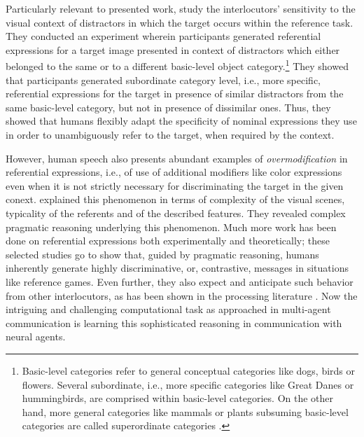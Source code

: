 Particularly relevant to presented work, \cite{graf2016animal} study the interlocutors' sensitivity to the visual context of distractors in which the target occurs within the reference task. They conducted an experiment wherein participants generated referential expressions for a target image presented in context of distractors which either belonged to the same or to a different basic-level object category.\footnote{Basic-level categories refer to general conceptual categories like dogs, birds or flowers. Several subordinate, i.e., more specific categories like Great Danes or hummingbirds, are comprised within basic-level categories. On the other hand, more general categories like mammals or plants subsuming basic-level categories are called superordinate categories \parencite{rosch1976basic}.} They showed that participants generated subordinate category level, i.e., more specific, referential expressions for the target in presence of similar distractors from the same basic-level category, but not in presence of dissimilar ones. Thus, they showed that humans flexibly adapt the specificity of nominal expressions they use in order to unambiguously refer to the target, when required by the context. 

However, human speech also presents abundant examples of \textit{overmodification} in referential expressions, i.e., of use of additional modifiers like color expressions even when it is not strictly necessary for discriminating the target in the given conext. \cite{degen2020redundancy} explained this phenomenon in terms of complexity of the visual scenes, typicality of the referents and of the described features. They revealed complex pragmatic reasoning underlying this phenomenon. Much more work has been done on referential expressions both experimentally and theoretically; these selected studies go to show that, guided by pragmatic reasoning, humans inherently generate highly discriminative, or, contrastive, messages in situations like reference games. Even further, they also expect and anticipate such behavior from other interlocutors, as has been shown in the processing literature \parencite[e.~g.,~cf.][]{sedivy1999achieving}. Now the intriguing and challenging computational task as approached in multi-agent communication is learning this sophisticated reasoning in communication with neural agents.



